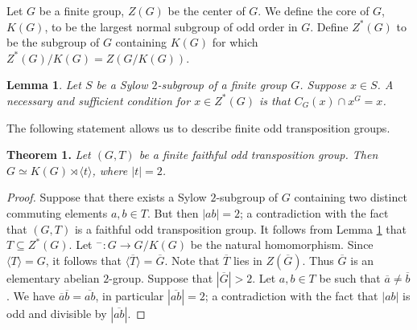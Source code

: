\documentclass[12pt]{article}
\newcommand\la{\langle}
\newcommand\ra{\rangle}
\newtheorem{lem}{Lemma}
\begin{document}
	
	
Let $G$ be a finite group, $Z(G)$ be the center of $G$. We define the core of $G$, $K(G)$, to be the largest normal subgroup of odd order in $G$. Define $Z^*(G)$ to be the subgroup of $G$ containing $K(G)$ for which $Z^*(G)/K(G) = Z(G/K(G))$.
	
	\begin{lem}\cite[Corollary 1 (Glauberman’s $Z^{*}$-Theorem)]{Gl66}\label{Gl}
		Let $S$ be a Sylow $2$-subgroup of a finite group $G$. Suppose $x \in S$. A necessary and sufficient condition for $x \in Z^*(G)$ is that $C_G(x)\cap x^G=x$.
	\end{lem}
The following statement allows us to describe finite odd transposition groups.

\bigskip
\noindent\textbf{Theorem 1.}
\textit{ Let $(G,T)$ be a finite faithful odd transposition group. Then $G\simeq K(G)\rtimes \la t\ra$, where $|t|=2$.
}
\begin{proof}
Suppose that there exists a Sylow $2$-subgroup of $G$ containing two distinct commuting elements $a,b\in T$. But then $|ab|=2$; a contradiction with the fact that $(G,T)$ is a faithful odd transposition group. It follows from Lemma \ref{Gl} that $T\subseteq Z^*(G)$. Let $^-: G\rightarrow G/K(G)$ be the natural homomorphism. Since $\la T\ra=G$, it follows that $\la\overline{T}\ra=\overline{G}$. Note that $\overline{T}$ lies in $Z(\overline{G})$. Thus $\overline{G}$ is an elementary abelian $2$-group. Suppose that $|\overline{G}|>2$. Let $a,b\in T$ be such that $\overline{a}\neq\overline{b}$. We have $\overline{a}\overline{b}=\overline{ab}$, in particular $|\overline{ab}|=2$; a contradiction with the fact that $|ab|$ is odd and divisible by $|\overline{ab}|$.


\end{proof}
\end{document}
